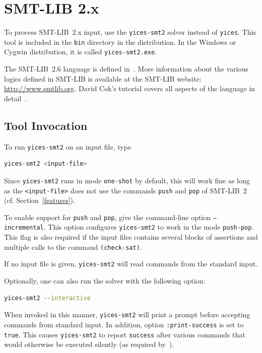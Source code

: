 \documentclass[11pt,twoside,fleqn,openright,titlepage]{cslreport}
\begin{document}
\section{SMT-LIB 2.x}

To process SMT-LIB~2.x input, use the \texttt{yices-smt2} solver
instead of \texttt{yices}. This tool is included in the \texttt{bin}
directory in the distribution. In the Windows or Cygwin distribution,
it is called \texttt{yices-smt2.exe}.

\medskip\noindent The SMT-LIB~2.6 language is defined
in~\cite{SMTLIB26:2017}. More information about the various logics
defined in SMT-LIB is available at the SMT-LIB website:
\url{http://www.smtlib.org}. David Cok's tutorial covers all aspects
of the language in detail~\cite{SMTLIB:tutorial:2013}.


\subsection{Tool Invocation}
\label{smt2-tool}

To run \texttt{yices-smt2} on an input file, type
\begin{small}
\begin{lstlisting}[language=sh]
   yices-smt2 <input-file>
\end{lstlisting}
\end{small}
Since \texttt{yices-smt2} runs in mode \texttt{one-shot} by default,
this will work fine as long as the \texttt{<input-file>} does not use
the commands \texttt{push} and \texttt{pop} of SMT-LIB~2
(cf. Section~\ref{features}).

\medskip\noindent To enable support for \texttt{push} and
\texttt{pop}, give the command-line option \texttt{--incremental}.
This option configures \texttt{yices-smt2} to work in the mode
\texttt{push-pop}. This flag is also required if the input files
contains several blocks of assertions and multiple calls to the
command \texttt{(check-sat)}.

\medskip\noindent If no input file is given,
\texttt{yices-smt2} will read commands from the standard
input.

\medskip\noindent Optionally, one can also run the solver with the
following option:
\begin{small}
\begin{lstlisting}[language=sh]
   yices-smt2 --interactive
\end{lstlisting}
\end{small}
When invoked in this manner, \texttt{yices-smt2} will print a prompt
before accepting commands from standard input. In addition, option
\texttt{:print-success} is set to \texttt{true}. This causes
\texttt{yices-smt2} to report \texttt{success} after various commands
that would otherwise be executed silently (as required
by~\cite{SMTLIB25:2015}).
\end{document}
